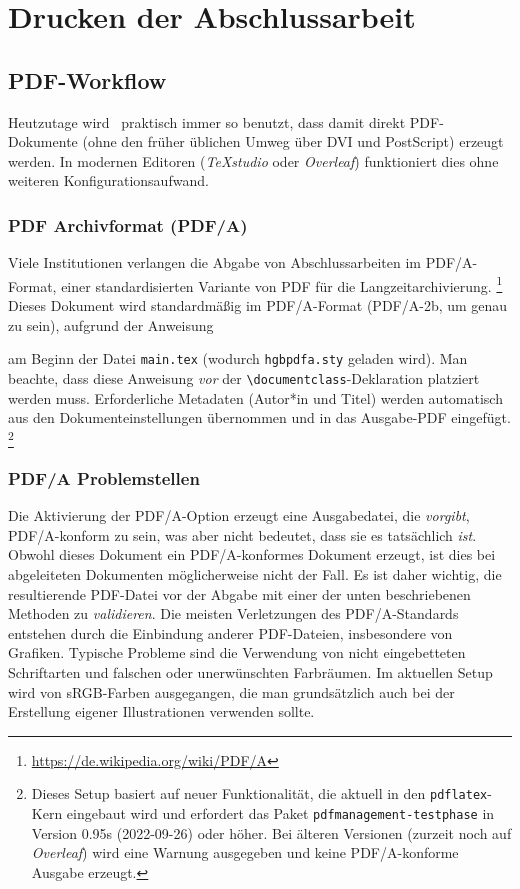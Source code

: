 \chapter{Drucken der Abschlussarbeit}
\label{cha:Drucken}


\section{PDF-Workflow}
\label{sec:pdf}

Heutzutage wird \latex\ praktisch immer so benutzt, dass damit direkt PDF-Dokumente
(ohne den früher üblichen Umweg über DVI und PostScript) erzeugt werden.
In modernen Editoren (\zB \emph{TeXstudio} oder \emph{Overleaf}) funktioniert dies
ohne weiteren Konfigurationsaufwand.


\subsection{PDF Archivformat (PDF/A)}
\label{sec:PDFA}

Viele Institutionen verlangen die Abgabe von Abschlussarbeiten im PDF/A-Format, einer
standardisierten Variante von PDF für die Langzeitarchivierung.%
\footnote{\url{https://de.wikipedia.org/wiki/PDF/A}}
Dieses Dokument wird standardmäßig im PDF/A-Format (PDF/A-2b, um genau zu sein),
aufgrund der Anweisung
%
\begin{LaTeXCode}[numbers=none]
\RequirePackage{hgbpdfa}
\end{LaTeXCode}
%
am Beginn der Datei \verb!main.tex! (wodurch \verb!hgbpdfa.sty! geladen wird).
Man beachte, dass diese Anweisung \emph{vor} der \verb!\documentclass!-Deklaration
platziert werden muss. Erforderliche Meta\-daten (\zB Autor*in und Titel) werden
automatisch aus den Dokumenteinstellungen übernommen und in das Ausgabe-PDF eingefügt.%
\footnote{Dieses Setup basiert auf neuer Funktionalität, die aktuell in den
\texttt{pdflatex}-Kern eingebaut wird und erfordert das Paket 
\texttt{pdfmanagement-testphase} in Version 0.95s (2022-09-26) oder höher.
Bei älteren Versionen (\zB zurzeit noch auf \emph{Overleaf}) wird eine Warnung
ausgegeben und keine PDF/A-konforme Ausgabe erzeugt.}


\subsection{PDF/A Problemstellen}
\label{sec:PDFA-issues}

Die Aktivierung der PDF/A-Option erzeugt eine Ausgabedatei, die \emph{vorgibt},
PDF/A-konform zu sein, was aber nicht bedeutet, dass sie es tatsächlich \emph{ist}.
Obwohl dieses Dokument ein PDF/A-konformes Dokument erzeugt, ist dies bei abgeleiteten
Dokumenten möglicherweise nicht der Fall. Es ist daher wichtig, die resultierende
PDF-Datei vor der Abgabe mit einer der unten beschriebenen Methoden zu 
\emph{validieren}. Die meisten Verletzungen des PDF/A-Standards entstehen durch 
die Einbindung anderer PDF-Dateien, insbesondere von Grafiken. Typische Probleme 
sind die Verwendung von nicht eingebetteten Schriftarten und falschen oder 
unerwünschten Farbräumen. Im aktuellen Setup wird von sRGB-Farben ausgegangen, die man
grundsätzlich auch bei der Erstellung eigener Illustrationen verwenden sollte.

